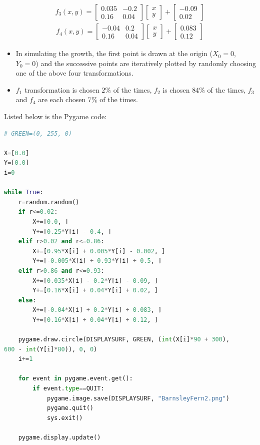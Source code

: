 \documentclass{article}
\begin{document}
\begin{gather}
f_3(x, y)=\begin{bmatrix}0.035 & -0.2 \\ 0.16 & 0.04 \end{bmatrix}\begin{bmatrix}x\\y\end{bmatrix} + \begin{bmatrix}-0.09\\0.02\end{bmatrix}
\end{gather}
\begin{gather}
f_4(x, y)=\begin{bmatrix}-0.04 & 0.2\\ 0.16 & 0.04 \end{bmatrix}\begin{bmatrix}x\\y\end{bmatrix} + \begin{bmatrix}0.083\\0.12\end{bmatrix}
\end{gather}

\begin{itemize}
\item In simulating the growth, the first point is drawn at the origin ($X_0=0$, $Y_0=0$) and the successive points are iteratively plotted by randomly choosing one of the above four transformations.
\item $f_1$ transformation is chosen $2\%$ of the times, $f_2$ is chosen $84\%$ of the times, $f_3$ and $f_4$ are each chosen $7\%$ of the times.
\end{itemize}
Listed below is the Pygame code:
\begin{lstlisting}[language=Python, frame=single]
# GREEN=(0, 255, 0)

X=[0.0]
Y=[0.0]
i=0

while True:
    r=random.random() 
    if r<=0.02:
        X+=[0.0, ]
        Y+=[0.25*Y[i] - 0.4, ]
    elif r>0.02 and r<=0.86:
        X+=[0.95*X[i] + 0.005*Y[i] - 0.002, ]
        Y+=[-0.005*X[i] + 0.93*Y[i] + 0.5, ]
    elif r>0.86 and r<=0.93:
        X+=[0.035*X[i] - 0.2*Y[i] - 0.09, ]
        Y+=[0.16*X[i] + 0.04*Y[i] + 0.02, ]
    else:
        X+=[-0.04*X[i] + 0.2*Y[i] + 0.083, ]
        Y+=[0.16*X[i] + 0.04*Y[i] + 0.12, ]
    
    pygame.draw.circle(DISPLAYSURF, GREEN, (int(X[i]*90 + 300),
600 - int(Y[i]*80)), 0, 0)
    i+=1
    
    for event in pygame.event.get():
        if event.type==QUIT:
            pygame.image.save(DISPLAYSURF, "BarnsleyFern2.png")
            pygame.quit()
            sys.exit()

    pygame.display.update()
\end{lstlisting}
\end{document}
